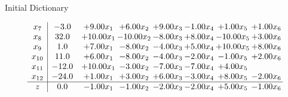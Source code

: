 \documentclass[8pt]{article}
\begin{document}
Initial Dictionary 

\[\begin{array}{c| c c@{\hskip 2pt} c@{\hskip 2pt} c@{\hskip 2pt} c@{\hskip 2pt} c@{\hskip 2pt} c@{\hskip 2pt} }
 x_{7}   &  -3.0 & +  9.00 x_{1} & +  6.00 x_{2} & +  9.00 x_{3} & -1.00 x_{4} & +  1.00 x_{5} & +  1.00 x_{6}\\
 x_{8}   &  32.0 & + 10.00 x_{1} & -10.00 x_{2} & -8.00 x_{3} & +  8.00 x_{4} & -10.00 x_{5} & +  3.00 x_{6}\\
 x_{9}   &  1.0 & +  7.00 x_{1} & -8.00 x_{2} & -4.00 x_{3} & +  5.00 x_{4} & + 10.00 x_{5} & +  8.00 x_{6}\\
 x_{10}   &  11.0 & +  6.00 x_{1} & -8.00 x_{2} & -4.00 x_{3} & -2.00 x_{4} & -1.00 x_{5} & +  2.00 x_{6}\\
 x_{11}   &  -12.0 & + 10.00 x_{1} & -3.00 x_{2} & -7.00 x_{3} & -7.00 x_{4} & +  4.00 x_{5} &   \\
 x_{12}   &  -24.0 & +  1.00 x_{1} & +  3.00 x_{2} & +  6.00 x_{3} & -3.00 x_{4} & +  8.00 x_{5} & -2.00 x_{6}\\
\hline
z    &  0.0 & -1.00 x_{1} & -1.00 x_{2} & -2.00 x_{3} & -2.00 x_{4} & +  5.00 x_{5} & -1.00 x_{6}\\
\end{array}\]
\end{document}
